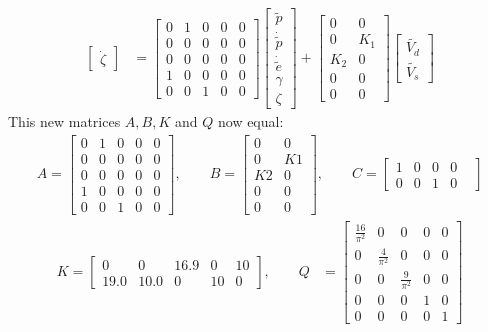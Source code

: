 \begin{align*}
\begin{bmatrix}
    \dot{\zeta}
\end{bmatrix} &= 
\begin{bmatrix}
    0 & 1 & 0 & 0 & 0\\
    0 & 0 & 0 & 0 & 0\\
    0 & 0 & 0 & 0 & 0\\
    1 & 0 & 0 & 0 & 0\\
    0 & 0 & 1 & 0 & 0
\end{bmatrix}
\begin{bmatrix}
    \tilde{p}\\
    \dot{\tilde{p}}\\
    \dot{\tilde{e}}\\
    \gamma\\
    \zeta
\end{bmatrix} + 
\begin{bmatrix}
    0 & 0\\
    0 & K_1\\
    K_2 & 0\\
    0 & 0\\
    0 & 0
\end{bmatrix}
\begin{bmatrix}
    \tilde{V_d}\\
    \tilde{V_s}
\end{bmatrix}
\end{align*}
This new matrices $A, B, K$ and $Q$ now equal:
\begin{align*}
A = \begin{bmatrix}
    0 & 1 & 0 & 0 & 0\\
    0 & 0 & 0 & 0 & 0\\
    0 & 0 & 0 & 0 & 0\\
    1 & 0 & 0 & 0 & 0\\
    0 & 0 & 1 & 0 & 0
\end{bmatrix},\qquad
B = \begin{bmatrix}
    0 & 0\\
    0 & K1\\
    K2 & 0\\
    0 & 0\\
    0 & 0
\end{bmatrix},\qquad
C = \begin{bmatrix}
1 & 0 & 0 & 0 &\\
0 & 0 & 1 & 0 &
\end{bmatrix}
\end{align*}
\begin{align*}
K = \begin{bmatrix}
0       & 0     & 16.9 & 0     & 10\\
19.0   & 10.0 & 0     & 10    & 0 
\end{bmatrix}, \qquad
Q &= \begin{bmatrix}
    \frac{16}{\pi^2} & 0 & 0 & 0 & 0\\
    0 & \frac{4}{\pi^2} & 0 & 0 & 0\\
    0 & 0 & \frac{9}{\pi^2} & 0 & 0 \\
    0 & 0 & 0 & 1 & 0 \\
    0 & 0 & 0 & 0 & 1
\end{bmatrix}
\end{align*}

